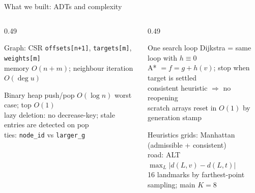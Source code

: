 \documentclass[aspectratio=169,10pt]{beamer}
\begin{document}
\begin{frame}{What we built: ADTs and complexity}
  \begin{columns}[T,onlytextwidth]
    \begin{column}{0.49\textwidth}
      \begin{block}{Graph: CSR}
        \small
        \texttt{offsets[n+1]}, \texttt{targets[m]}, \texttt{weights[m]}\\
        memory $O(n+m)$; neighbour iteration $O(\deg u)$
      \end{block}
      \begin{block}{Binary heap}
        \small
        push/pop $O(\log n)$ worst case; top $O(1)$\\
        lazy deletion: no decrease-key; stale entries are detected on pop\\
        ties: \texttt{node\_id} vs \texttt{larger\_g}
      \end{block}
    \end{column}
    \begin{column}{0.49\textwidth}
      \begin{block}{One search loop}
        \small
        Dijkstra = same loop with $h\equiv 0$\\
        A* $= f=g+h(v)$; stop when target is settled\\
        consistent heuristic $\Rightarrow$ no reopening\\
        scratch arrays reset in $O(1)$ by generation stamp
      \end{block}
      \begin{block}{Heuristics}
        \small
        grids: Manhattan (admissible + consistent)\\
        road: ALT $\max_L |d(L,v)-d(L,t)|$\\
        16 landmarks by farthest-point sampling; main $K=8$
      \end{block}
    \end{column}
  \end{columns}
\end{frame}
\end{document}
